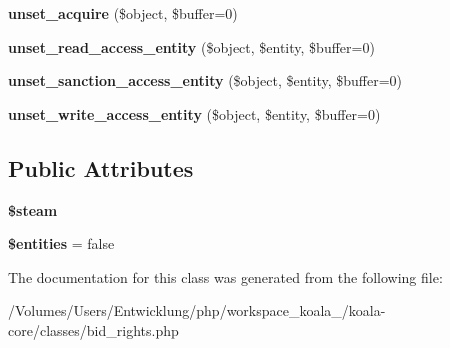 \begin{DoxyCompactItemize}
\item 
\hypertarget{classrights_acd35543e053dcf96fa20c0323f55568f}{
{\bfseries unset\_\-acquire} (\$object, \$buffer=0)}
\label{classrights_acd35543e053dcf96fa20c0323f55568f}

\item 
\hypertarget{classrights_afb2043de73eda4b5ee304939b846e651}{
{\bfseries unset\_\-read\_\-access\_\-entity} (\$object, \$entity, \$buffer=0)}
\label{classrights_afb2043de73eda4b5ee304939b846e651}

\item 
\hypertarget{classrights_a9545e3add5d99ac4a94f728860238c00}{
{\bfseries unset\_\-sanction\_\-access\_\-entity} (\$object, \$entity, \$buffer=0)}
\label{classrights_a9545e3add5d99ac4a94f728860238c00}

\item 
\hypertarget{classrights_a879b2f0c5bbea167525f3b12ff9879d0}{
{\bfseries unset\_\-write\_\-access\_\-entity} (\$object, \$entity, \$buffer=0)}
\label{classrights_a879b2f0c5bbea167525f3b12ff9879d0}

\end{DoxyCompactItemize}
\subsection*{Public Attributes}
\begin{DoxyCompactItemize}
\item 
\hypertarget{classrights_a03052ee922674a4349e42dc6f707ad35}{
{\bfseries \$steam}}
\label{classrights_a03052ee922674a4349e42dc6f707ad35}

\item 
\hypertarget{classrights_a7eea54d69a1206cc056bac0d07dba13f}{
{\bfseries \$entities} = false}
\label{classrights_a7eea54d69a1206cc056bac0d07dba13f}

\end{DoxyCompactItemize}


The documentation for this class was generated from the following file:\begin{DoxyCompactItemize}
\item 
/Volumes/Users/Entwicklung/php/workspace\_\-koala\_/koala-\/core/classes/bid\_\-rights.php\end{DoxyCompactItemize}
